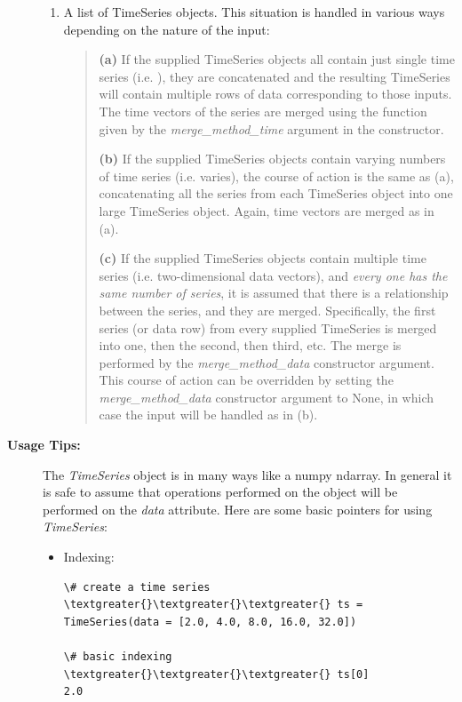 \documentclass[letterpaper,10pt,english]{sphinxmanual}
\begin{document}
\begin{fulllineitems}
\begin{description}
\begin{enumerate}
\item {} 
A list of TimeSeries objects. This situation is handled in various ways depending on the nature of the input:
\begin{quote}

\textbf{(a)} If the supplied TimeSeries objects all contain just single time series (i.e. ), they are concatenated and the resulting TimeSeries will contain multiple rows of data corresponding to those inputs. The time vectors of the series are merged using the function given by the \emph{merge\_method\_time} argument in the constructor.

\textbf{(b)} If the supplied TimeSeries objects contain varying numbers of time series (i.e.  varies), the course of action is the same as (a), concatenating all the series from each TimeSeries object into one large TimeSeries object. Again, time vectors are merged as in (a).

\textbf{(c)} If the supplied TimeSeries objects contain multiple time series (i.e. two-dimensional data vectors), and \emph{every one has the same number of series}, it is assumed that there is a relationship between the series, and they are merged. Specifically, the first series (or data row) from every supplied TimeSeries is merged into one, then the second, then third, etc. The merge is performed by the \emph{merge\_method\_data} constructor argument. This course of action can be overridden by setting the \emph{merge\_method\_data} constructor argument to None, in which case the input will be handled as in (b).
\end{quote}

\end{enumerate}

\item[{\textbf{Usage Tips:}}] \leavevmode
The \emph{TimeSeries} object is in many ways like a numpy ndarray. In general it is safe to assume that operations performed on the object will be performed on the \emph{data} attribute. Here are some basic pointers for using \emph{TimeSeries}:
\begin{itemize}
\item {} 
Indexing:

\begin{Verbatim}[commandchars=\\\{\}]
\# create a time series
\textgreater{}\textgreater{}\textgreater{} ts = TimeSeries(data = [2.0, 4.0, 8.0, 16.0, 32.0])

\# basic indexing
\textgreater{}\textgreater{}\textgreater{} ts[0]
2.0


\end{Verbatim}
\end{itemize}
\end{description}
\end{fulllineitems}
\end{document}
